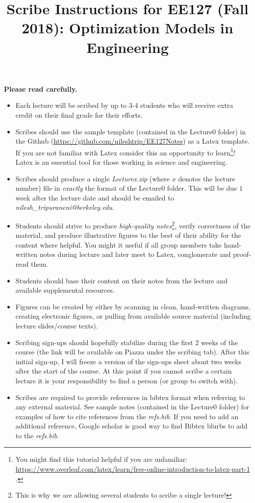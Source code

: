 \documentclass[12pt]{article}
\title{Scribe Instructions for EE127 (Fall 2018): Optimization Models in Engineering}
\date{}
\begin{document}
\maketitle

{\bf\color{red} Please read carefully.}

\begin{itemize}
\item Each lecture will be scribed by up to 3-4 students who will receive extra credit on their final grade for their efforts.

\item Scribes should use the sample template (contained in the Lecture0 folder) in the Github (\url{https://github.com/nileshtrip/EE127Notes}) as a Latex template. If you are not familiar with Latex consider this an opportunity to learn\footnote{You might find this tutorial helpful if you are unfamiliar: \url{https://www.overleaf.com/latex/learn/free-online-introduction-to-latex-part-1} .}! Latex is an essential tool for those working in science and engineering.

\item Scribes should produce a single \emph{Lecturex.zip} (where $x$ denotes the lecture number) file in \textit{exactly} the format of the Lecture0 folder. This will be due $1$ week after the lecture date and should be emailed to \emph{nilesh\_tripuraneni@berkeley.edu}.

\item Students should strive to produce \textit{high-quality notes}\footnote{This is why we are allowing several students to scribe a single lecture!}, verify correctness of the material, and produce illustrative figures to the best of their ability for the content where helpful. You might it useful if all group members take hand-written notes during lecture and later meet to Latex, conglomerate and proof-read them.

\item Students should base their content on their notes from the lecture and available supplemental resources.

\item Figures can be created by either by scanning in clean, hand-written diagrams, creating electronic figures, or pulling from available source material (including lecture slides/course texts).

\item Scribing sign-ups should hopefully stabilize during the first 2 weeks of the course (the link will be available on Piazza under the scribing tab). After this initial sign-up, I will freeze a version of the sign-ups sheet about two weeks after the start of the course. At this point if you cannot scribe a certain lecture it is your responsibility to find a person (or group to switch with).
\item Scribes are required to provide references in bibtex format when referring to any external material. See sample notes (contained in the Lecture0 folder) for examples of how to cite references from the \emph{refs.bib}. If you need to add an additional reference, Google scholar is good way to find Bibtex blurbs to add to the \emph{refs.bib}.
\end{itemize}
\end{document}
